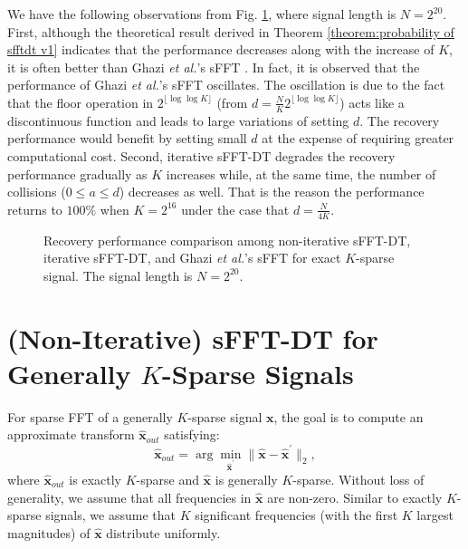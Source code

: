 \documentclass[journal,onecolumn,11pt]{IEEEtran}
\begin{document}
We have the following observations from Fig. \ref{fig:Performance}, where signal length is $N=2^{20}$.
First, although the theoretical result derived in Theorem \ref{theorem:probability of sfftdt v1} indicates that the performance decreases along with the increase of $K$, it is often better than Ghazi {\em et al.}'s sFFT \cite{Ghazi2013}.
In fact, it is observed that the performance of Ghazi {\em et al.}'s sFFT oscillates.
The oscillation is due to the fact that the floor operation in $2^{\lfloor \log\log K \rfloor}$ (from $  d=\frac{N}{K} 2^{\lfloor \log\log K \rfloor}$) acts like a discontinuous function and leads to large variations of setting $d$.
The recovery performance would benefit by setting small $d$ at the expense of requiring greater computational cost.
Second, iterative sFFT-DT degrades the recovery performance gradually as $K$ increases while, at the same time, the number of collisions ($0 \leq a \leq d$) decreases as well.
That is the reason the performance returns to $100\%$ when $K=2^{16}$ under the case that $  d = \frac{N}{4K}$.

\begin{figure}[t]
\begin{minipage}[b]{.98\linewidth}
\end{minipage}
\hfill
\caption{Recovery performance comparison among non-iterative sFFT-DT, iterative sFFT-DT, and Ghazi {\em et al.}'s sFFT \cite{Ghazi2013} for exact $K$-sparse signal. The signal length is $N=2^{20}$.}
\label{fig:Performance}
\end{figure}


\section{(Non-Iterative) sFFT-DT for Generally $K$-Sparse Signals}\label{Sec: sFFT-DT: General K-Sparse}
For sparse FFT of a generally $K$-sparse signal $\bm{x}$, the goal is to compute an approximate transform $\bm{\hat{x}}_{out}$ satisfying:
\small
\begin{equation}
\bm{\hat{x}}_{out}= \arg \min_{\bm{\hat{x}}^{'}}  \| \bm{\hat{x}}-\bm{\hat{x}}^{'} \|_{2},
\label{eq:general K-sparse signal}
\end{equation}
\normalsize
where $\bm{\hat{x}}_{out}$ is exactly $K$-sparse and $\bm{\hat{x}}$ is generally $K$-sparse. Without loss of generality, we assume that all frequencies in $\bm{\hat{x}}$ are non-zero.
Similar to exactly $K$-sparse signals, we assume that $K$ significant frequencies (with the first $K$ largest magnitudes) of $\bm{\hat{x}}$ distribute uniformly.
\end{document}
